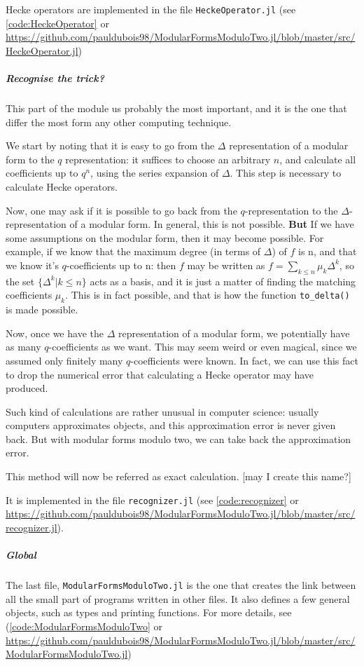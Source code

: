 Hecke operators are implemented in the file \texttt{HeckeOperator.jl} (see \ref{code:HeckeOperator} or \url{https://github.com/pauldubois98/ModularFormsModuloTwo.jl/blob/master/src/HeckeOperator.jl})
\subparagraph{Recognise the trick?}
This part of the module us probably the most important, and it is the one that differ the most form any other computing technique.

We start by noting that it is easy to go from the $\Delta$ representation of a modular form to the $q$ representation: it suffices to choose an arbitrary $n$, and calculate all coefficients up to $q^n$, using the series expansion of $\Delta$.
This step is necessary to calculate Hecke operators.

Now, one may ask if it is possible to go back from the $q$-representation to the $\Delta$-representation of a modular form.
In general, this is not possible.
\textbf{But}
If we have some assumptions on the modular form, then it may become possible.
For example, if we know that the maximum degree (in terms of $\Delta$) of $f$ is n, and that we know it's $q$-coefficients up to n:
then $f$ may be written as $f = \sum_{k \leq n} \mu_k \Delta^k$, so the set $\{ \Delta^k | k \leq n \}$ acts as a basis, and it is just a matter of finding the matching coefficients $\mu_k$.
This is in fact possible, and that is how the function \texttt{to\_delta()} is made possible.

Now, once we have the $\Delta$ representation of a modular form, we potentially have as many $q$-coefficients as we want.
This may seem weird or even magical, since we assumed only finitely many $q$-coefficients were known.
In fact, we can use this fact to drop the numerical error that calculating a Hecke operator may have produced.

Such kind of calculations are rather unusual in computer science: usually computers approximates objects, and this approximation error is never given back.
But with modular forms modulo two, we can take back the approximation error.

This method will now be referred as exact calculation. [may I create this name?]

It is implemented in the file \texttt{recognizer.jl} (see \ref{code:recognizer} or \url{https://github.com/pauldubois98/ModularFormsModuloTwo.jl/blob/master/src/recognizer.jl}).
\subparagraph{Global}
The last file, \texttt{ModularFormsModuloTwo.jl} is the one that creates the link between all the small part of programs written in other files.
It also defines a few general objects, such as types and printing functions.
For more details, see (\ref{code:ModularFormsModuloTwo} or \url{https://github.com/pauldubois98/ModularFormsModuloTwo.jl/blob/master/src/ModularFormsModuloTwo.jl})

